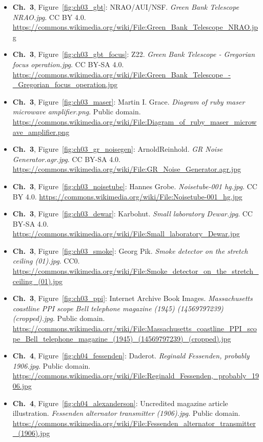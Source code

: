 \begin{small}
\begin{itemize}[leftmargin=0pt,itemsep=2pt,label={}]
\item \textbf{Ch.~3}, Figure~\ref{fig:ch03_gbt}: NRAO/AUI/NSF. \emph{Green Bank Telescope NRAO.\allowbreak{}jpg}. CC BY 4.0. \url{https://commons.wikimedia.org/wiki/File:Green_Bank_Telescope_NRAO.jpg}
\item \textbf{Ch.~3}, Figure~\ref{fig:ch03_gbt_focus}: Z22. \emph{Green Bank Telescope -\allowbreak{} Gregorian focus operation.\allowbreak{}jpg}. CC BY-SA 4.0. \url{https://commons.wikimedia.org/wiki/File:Green_Bank_Telescope_-_Gregorian_focus_operation.jpg}
\item \textbf{Ch.~3}, Figure~\ref{fig:ch03_maser}: Martin I. Grace. \emph{Diagram of ruby maser microwave amplifier.\allowbreak{}png}. Public domain. \url{https://commons.wikimedia.org/wiki/File:Diagram_of_ruby_maser_microwave_amplifier.png}
\item \textbf{Ch.~3}, Figure~\ref{fig:ch03_gr_noisegen}: ArnoldReinhold. \emph{GR Noise Generator.\allowbreak{}agr.\allowbreak{}jpg}. CC BY-SA 4.0. \url{https://commons.wikimedia.org/wiki/File:GR_Noise_Generator.agr.jpg}
\item \textbf{Ch.~3}, Figure~\ref{fig:ch03_noisetube}: Hannes Grobe. \emph{Noisetube-\allowbreak{}001 hg.\allowbreak{}jpg}. CC BY 4.0. \url{https://commons.wikimedia.org/wiki/File:Noisetube-001_hg.jpg}
\item \textbf{Ch.~3}, Figure~\ref{fig:ch03_dewar}: Karbohut. \emph{Small laboratory Dewar.\allowbreak{}jpg}. CC BY-SA 4.0. \url{https://commons.wikimedia.org/wiki/File:Small_laboratory_Dewar.jpg}
\item \textbf{Ch.~3}, Figure~\ref{fig:ch03_smoke}: Georg Pik. \emph{Smoke detector on the stretch ceiling (01).\allowbreak{}jpg}. CC0. \url{https://commons.wikimedia.org/wiki/File:Smoke_detector_on_the_stretch_ceiling_(01).jpg}
\item \textbf{Ch.~3}, Figure~\ref{fig:ch03_ppi}: Internet Archive Book Images. \emph{Massachusetts coastline PPI scope Bell telephone magazine (1945) (14569797239) (cropped).\allowbreak{}jpg}. Public domain. \url{https://commons.wikimedia.org/wiki/File:Massachusetts_coastline_PPI_scope_Bell_telephone_magazine_(1945)_(14569797239)_(cropped).jpg}
\item \textbf{Ch.~4}, Figure~\ref{fig:ch04_fessenden}: Daderot. \emph{Reginald Fessenden, probably 1906.\allowbreak{}jpg}. Public domain. \url{https://commons.wikimedia.org/wiki/File:Reginald_Fessenden,_probably_1906.jpg}
\item \textbf{Ch.~4}, Figure~\ref{fig:ch04_alexanderson}: Uncredited magazine article illustration. \emph{Fessenden alternator transmitter (1906).\allowbreak{}jpg}. Public domain. \url{https://commons.wikimedia.org/wiki/File:Fessenden_alternator_transmitter_(1906).jpg}

\end{itemize}
\end{small}
